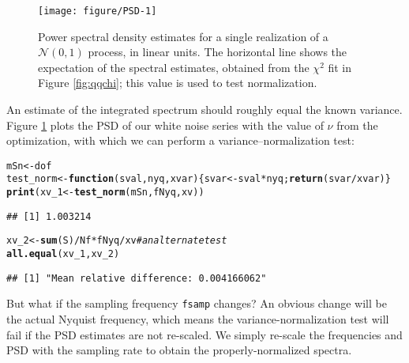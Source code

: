 \documentclass[10pt]{article}\usepackage[]{graphicx}\usepackage[]{color}
\makeatletter
\def\maxwidth{ %
  \ifdim\Gin@nat@width>\linewidth
    \linewidth
  \else
    \Gin@nat@width
  \fi
}
\newcommand{\hlcom}[1]{\textcolor[rgb]{0.678,0.584,0.686}{\textit{#1}}}%
\newcommand{\hlopt}[1]{\textcolor[rgb]{0,0,0}{#1}}%
\newcommand{\hlstd}[1]{\textcolor[rgb]{0.345,0.345,0.345}{#1}}%
\newcommand{\hlkwa}[1]{\textcolor[rgb]{0.161,0.373,0.58}{\textbf{#1}}}%
\newcommand{\hlkwb}[1]{\textcolor[rgb]{0.69,0.353,0.396}{#1}}%
\newcommand{\hlkwc}[1]{\textcolor[rgb]{0.333,0.667,0.333}{#1}}%
\newcommand{\hlkwd}[1]{\textcolor[rgb]{0.737,0.353,0.396}{\textbf{#1}}}%
\newenvironment{kframe}{%
 \def\at@end@of@kframe{}%
 \ifinner\ifhmode%
  \def\at@end@of@kframe{\end{minipage}}%
  \begin{minipage}{\columnwidth}%
 \fi\fi%
 \def\FrameCommand##1{\hskip\@totalleftmargin \hskip-\fboxsep
 \colorbox{shadecolor}{##1}\hskip-\fboxsep
     \hskip-\linewidth \hskip-\@totalleftmargin \hskip\columnwidth}%
 \MakeFramed {\advance\hsize-\width
   \@totalleftmargin\z@ \linewidth\hsize
   \@setminipage}}%
 {\par\unskip\endMakeFramed%
 \at@end@of@kframe}
\newenvironment{knitrout}{}{} %
\makeatother
\begin{document}
\begin{figure}[htb!]
\begin{center}
\begin{knitrout}
\color{fgcolor}
\texttt{[image: figure/PSD-1]} 

\end{knitrout}
\caption{Power spectral density estimates for a single realization of a 
$\mathcal{N}(0,1)$ process, in linear units.  
The horizontal line shows the expectation of the spectral estimates, obtained
from the $\chi^2$ fit in Figure \ref{fig:qqchi}; this value is
used to test normalization.}
\label{fig:psdN}
\end{center}
\end{figure}

An estimate of the integrated spectrum
should roughly equal the known variance.
Figure \ref{fig:psdN} plots the PSD of our white noise series with
the value of $\nu$ from the optimization, 
with which we can perform a variance--normalization
test:
\begin{knitrout}
\color{fgcolor}\begin{kframe}
\begin{alltt}
\hlstd{mSn} \hlkwb{<-} \hlstd{dof}
\hlstd{test_norm} \hlkwb{<-} \hlkwa{function}\hlstd{(}\hlkwc{sval}\hlstd{,} \hlkwc{nyq}\hlstd{,} \hlkwc{xvar}\hlstd{)\{svar} \hlkwb{<-} \hlstd{sval} \hlopt{*} \hlstd{nyq;} \hlkwd{return}\hlstd{(svar}\hlopt{/}\hlstd{xvar)\}}
\hlkwd{print}\hlstd{(xv_1} \hlkwb{<-} \hlkwd{test_norm}\hlstd{(mSn, fNyq, xv))}
\end{alltt}
\begin{verbatim}
## [1] 1.003214
\end{verbatim}
\begin{alltt}
\hlstd{xv_2} \hlkwb{<-} \hlkwd{sum}\hlstd{(S)}\hlopt{/}\hlstd{Nf} \hlopt{*} \hlstd{fNyq} \hlopt{/} \hlstd{xv}  \hlcom{# an alternate test}
\hlkwd{all.equal}\hlstd{(xv_1, xv_2)}
\end{alltt}
\begin{verbatim}
## [1] "Mean relative difference: 0.004166062"
\end{verbatim}
\end{kframe}
\end{knitrout}

But what if the sampling frequency \texttt{fsamp} changes? An obvious change will be
the actual Nyquist frequency, which means the variance-normalization test will
fail if the PSD estimates are not re-scaled.  We simply re-scale the frequencies
and PSD
with the sampling rate
to obtain the properly-normalized spectra.
\end{document}
